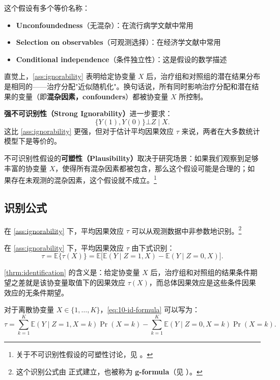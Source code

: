 这个假设有多个等价名称：
\begin{itemize}
  \item \textbf{Unconfoundedness}（无混杂）：在流行病学文献中常用
  \item \textbf{Selection on observables}（可观测选择）：在经济学文献中常用
  \item \textbf{Conditional independence}（条件独立性）：这是假设的数学描述
\end{itemize}

直觉上，\cref{ass:ignorability} 表明给定协变量 $X$ 后，治疗组和对照组的潜在结果分布是相同的——治疗分配"近似随机化"。换句话说，所有同时影响治疗分配和潜在结果的变量（即\textbf{混杂因素，confounders}）都被协变量 $X$ 所控制。

\textbf{强不可识别性（Strong Ignorability）}进一步要求：
\[
\{Y(1), Y(0)\} \bot Z \mid X.
\]
这比 \cref{ass:ignorability} 更强，但对于估计平均因果效应 $\tau$ 来说，两者在大多数统计模型下是等价的。

不可识别性假设的\textbf{可塑性（Plausibility）}取决于研究场景：如果我们观察到足够丰富的协变量 $X$，使得所有混杂因素都被包含，那么这个假设可能是合理的；如果存在未观测的混杂因素，这个假设就不成立。\footnote{关于不可识别性假设的可塑性讨论，见 \cite{Rosenbaum:2018}。}

\subsection{识别公式}\label{sec:10-id-formulas}

在 \cref{ass:ignorability} 下，平均因果效应 $\tau$ 可以从观测数据中非参数地识别。\footnote{这个识别公式由 \cite{Rosenbaum:1983} 正式建立，也被称为 \textbf{g-formula}（见 \cite{Hernan:2020}）。}

\begin{Theorem}[识别定理]\label{thrm:identification}
在 \cref{ass:ignorability} 下，平均因果效应 $\tau$ 由下式识别：
\begin{equation}
\tau = \mathbb{E}\{\tau(X)\}
= \mathbb{E}\big[\mathbb{E}(Y \mid Z = 1, X) - \mathbb{E}(Y \mid Z = 0, X)\big].
\label{eq:10-id-formula}
\end{equation}
\end{Theorem}

\cref{thrm:identification} 的含义是：给定协变量 $X$ 后，治疗组和对照组的结果条件期望之差就是该协变量取值下的因果效应 $\tau(X)$，而总体因果效应是这些条件因果效应的无条件期望。

对于离散协变量 $X \in \{1, \ldots, K\}$，\cref{eq:10-id-formula} 可以写为：
\begin{equation}
\tau = \sum_{k=1}^K \mathbb{E}(Y \mid Z = 1, X = k)\Pr(X = k) - \sum_{k=1}^K \mathbb{E}(Y \mid Z = 0, X = k)\Pr(X = k).
\label{eq:10-id-discrete}
\end{equation}

